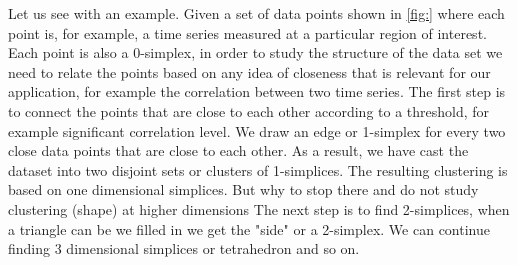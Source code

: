 \documentclass[onecollarge,runningheads]{svjour2}
\begin{document}
Let us see with an example. Given a set of data points shown in \ref{fig:} where each point is, for example, a time series measured at a particular region of interest. Each point is also a 0-simplex, in order to study the structure of the data set we need to relate the points based on any idea of closeness that is relevant for our application, for example the correlation between two time series.
The first step is to connect the points that are close to each other according to a threshold, for example  significant correlation level. We draw an edge or 1-simplex for every two close data points that are close to each other. As a result, we have  cast the dataset into two disjoint sets or clusters of 1-simplices. The resulting clustering is based on one dimensional simplices. But why to stop there and do not study clustering (shape) at higher dimensions
The next step is to find 2-simplices, when a triangle can be we filled in we get the "side" or a 2-simplex. We can continue finding 3 dimensional simplices or tetrahedron and so on.



\end{document}
